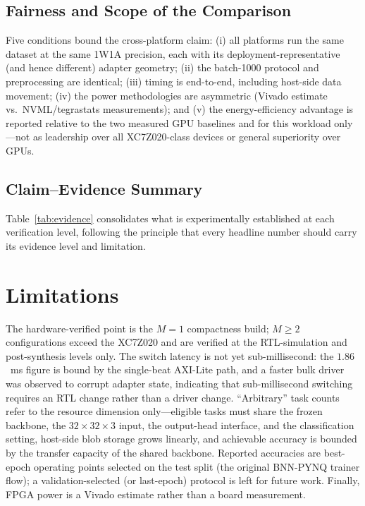 \documentclass[journal]{IEEEtran}
\begin{document}
\subsection{Fairness and Scope of the Comparison}
Five conditions bound the cross-platform claim: (i) all platforms run the same dataset at the same 1W1A precision, each with its deployment-representative (and hence different) adapter geometry; (ii) the batch-1000 protocol and preprocessing are identical; (iii) timing is end-to-end, including host-side data movement; (iv) the power methodologies are asymmetric (Vivado estimate vs.\ NVML/tegrastats measurements); and (v) the energy-efficiency advantage is reported relative to the two measured GPU baselines and for this workload only---not as leadership over all XC7Z020-class devices or general superiority over GPUs.

\subsection{Claim--Evidence Summary}
Table~\ref{tab:evidence} consolidates what is experimentally established at each verification level, following the principle that every headline number should carry its evidence level and limitation.



\section{Limitations}
The hardware-verified point is the $M{=}1$ compactness build; $M{\geq}2$ configurations exceed the XC7Z020 and are verified at the RTL-simulation and post-synthesis levels only. The switch latency is not yet sub-millisecond: the $1.86$~ms figure is bound by the single-beat AXI-Lite path, and a faster bulk driver was observed to corrupt adapter state, indicating that sub-millisecond switching requires an RTL change rather than a driver change. ``Arbitrary'' task counts refer to the resource dimension only---eligible tasks must share the frozen backbone, the $32{\times}32{\times}3$ input, the output-head interface, and the classification setting, host-side blob storage grows linearly, and achievable accuracy is bounded by the transfer capacity of the shared backbone. Reported accuracies are best-epoch operating points selected on the test split (the original BNN-PYNQ trainer flow); a validation-selected (or last-epoch) protocol is left for future work. Finally, FPGA power is a Vivado estimate rather than a board measurement.
\end{document}
